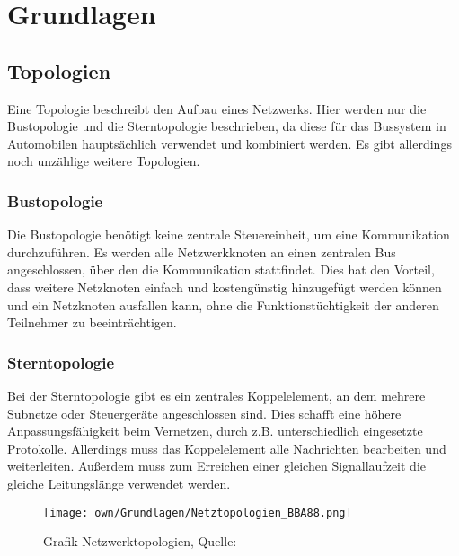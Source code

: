 \section{Grundlagen}

    \subsection{Topologien}
Eine Topologie beschreibt den Aufbau eines Netzwerks.
Hier werden nur die Bustopologie und die Sterntopologie beschrieben, da diese für das Bussystem in Automobilen hauptsächlich verwendet und kombiniert werden.
Es gibt allerdings noch unzählige weitere Topologien.
    \subsubsection{Bustopologie}
    Die Bustopologie benötigt keine zentrale Steuereinheit, um eine Kommunikation durchzuführen.
    Es werden alle Netzwerkknoten an einen zentralen Bus angeschlossen, über den die Kommunikation stattfindet.
    Dies hat den Vorteil, dass weitere Netzknoten einfach und kostengünstig hinzugefügt werden können und ein Netzknoten ausfallen kann, ohne die Funktionstüchtigkeit der anderen Teilnehmer zu beeinträchtigen.
    
    \subsubsection{Sterntopologie}
    Bei der Sterntopologie gibt es ein zentrales Koppelelement, an dem mehrere Subnetze oder Steuergeräte angeschlossen sind.
    Dies schafft eine höhere Anpassungsfähigkeit beim Vernetzen, durch z.B. unterschiedlich eingesetzte Protokolle.
    Allerdings muss das Koppelelement alle Nachrichten bearbeiten und weiterleiten.
    Außerdem muss zum Erreichen einer gleichen Signallaufzeit die gleiche Leitungslänge verwendet werden.

    \begin{figure}[!htbp]
        \centering
        \texttt{[image: own/Grundlagen/Netztopologien\_BBA88.png]}
        \caption{Grafik Netzwerktopologien, Quelle: \cite{BAA2011, S.88}}
        \label{fig:Netzwerktopologien}
    \end{figure}

